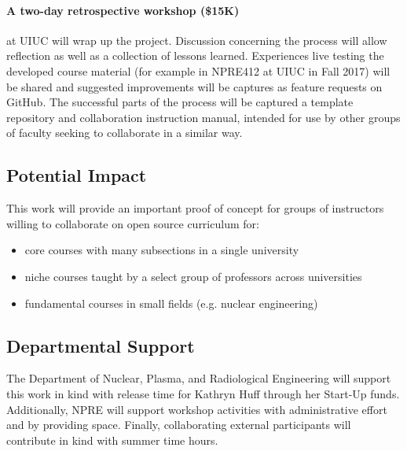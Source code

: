 \documentclass[11pt]{article}
\begin{document}
          \paragraph{A two-day retrospective workshop (\$15K)} at UIUC will wrap up the 
          project. Discussion concerning the process will allow reflection as 
          well as a collection of lessons learned.
          Experiences live testing the developed course material (for example 
          in NPRE412 at UIUC in Fall 2017) will be shared and suggested 
          improvements will be captures as feature requests on GitHub.  The 
          successful parts of the process will be captured a template 
          repository and collaboration instruction manual, intended for use by 
          other groups of faculty seeking to collaborate in a similar way. 

          \subsection*{Potential Impact}
          
          This work will provide an important proof of concept for groups of 
          instructors willing to collaborate on open source curriculum for:
          \begin{itemize}
                  \item core courses with many subsections in a single university
                  \item niche courses taught by a select group of professors across 
          universities
                  \item fundamental courses in small fields (e.g. nuclear engineering)
          \end{itemize}

          \subsection*{Departmental Support}
          The Department of Nuclear, Plasma, and Radiological Engineering will 
          support this work in kind with release time for Kathryn Huff through 
          her Start-Up funds.  Additionally, NPRE will support workshop activities 
          with administrative effort and by providing space. Finally, 
          collaborating external participants will contribute in kind with 
          summer time hours.


          
          

          
\end{document}

